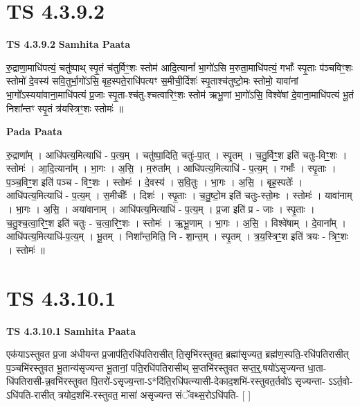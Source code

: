\documentclass[17pt]{extarticle}
\begin{document}

\section{ TS 4.3.9.2 }

\textbf{TS 4.3.9.2 } \newline
\textbf{Samhita Paata} \newline

रु॒द्राणा॒माधि॑पत्यं॒ चतु॑ष्पाथ् स्पृ॒तं च॑तुर्विꣳ॒॒शः स्तोम॑ आदि॒त्यानां᳚ भा॒गो॑ऽसि म॒रुता॒माधि॑पत्यं॒ गर्भाः᳚ स्पृ॒ताः प॑ञ्चविꣳ॒॒शः स्तोमो॑ दे॒वस्य॑ सवि॒तुर्भा॒गो॑ऽसि॒ बृह॒स्पते॒राधि॑पत्यꣳ स॒मीची॒र्दिशः॑ स्पृ॒ताश्च॑तुष्टो॒मः स्तोमो॒ यावा॑नां भा॒गो᳚ऽस्यया॑वाना॒माधि॑पत्यं प्र॒जाः स्पृ॒ता-श्च॑तु-श्चत्वारिꣳ॒॒शः स्तोम॑ ऋभू॒णां भा॒गो॑ऽसि॒ विश्वे॑षां दे॒वाना॒माधि॑पत्यं भू॒तं निशा᳚न्तꣳ स्पृ॒तं त्र॑यस्त्रिꣳ॒॒शः स्तोमः॑ ॥ \newline

\textbf{Pada Paata} \newline

रु॒द्राणा᳚म् । आधि॑पत्य॒मित्याधि॑ - प॒त्य॒म् । चतु॑ष्पा॒दिति॒ चतुः॑-पा॒त् । स्पृ॒तम् । च॒तु॒र्विꣳ॒॒श इति॑ चतुः-विꣳ॒॒शः । स्तोमः॑ । आ॒दि॒त्याना᳚म् । भा॒गः । अ॒सि॒ । म॒रुता᳚म् । आधि॑पत्य॒मित्याधि॑ - प॒त्य॒म् । गर्भाः᳚ । स्पृ॒ताः । प॒ञ्च॒विꣳ॒॒श इति॑ पञ्च - विꣳ॒॒शः । स्तोमः॑ । दे॒वस्य॑ । स॒वि॒तुः । भा॒गः । अ॒सि॒ । बृह॒स्पतेः᳚ । आधि॑पत्य॒मित्याधि॑ - प॒त्य॒म् । स॒मीचीः᳚ । दिशः॑ । स्पृ॒ताः । च॒तु॒ष्टो॒म इति॑ चतुः-स्तो॒मः । स्तोमः॑ । यावा॑नाम् । भा॒गः । अ॒सि॒ । अया॑वानाम् । आधि॑पत्य॒मित्याधि॑ - प॒त्य॒म् । प्र॒जा इति॑ प्र - जाः । स्पृ॒ताः । च॒तु॒श्च॒त्वा॒रिꣳ॒॒श इति॑ चतुः - च॒त्वा॒रिꣳ॒॒शः । स्तोमः॑ । ऋ॒भू॒णाम् । भा॒गः । अ॒सि॒ । विश्वे॑षाम् । दे॒वाना᳚म् । आधि॑पत्य॒मित्याधि॑-प॒त्य॒म् । भू॒तम् । निशा᳚न्त॒मिति॒ नि - शा॒न्त॒म् । स्पृ॒तम् । त्र॒य॒स्त्रिꣳ॒॒श इति॑ त्रयः - त्रिꣳ॒॒शः । स्तोमः॑ ॥  \newline





\section{ TS 4.3.10.1 }

\textbf{TS 4.3.10.1 } \newline
\textbf{Samhita Paata} \newline

एक॑याऽस्तुवत प्र॒जा अ॑धीयन्त प्र॒जाप॑ति॒रधि॑पतिरासीत् ति॒सृभि॑रस्तुवत॒ ब्रह्मा॑सृज्यत॒ ब्रह्म॑ण॒स्पति॒-रधि॑पतिरासीत् प॒ञ्चभि॑रस्तुवत भू॒तान्य॑सृज्यन्त भू॒तानां॒ पति॒रधि॑पतिरासीथ् स॒प्तभि॑रस्तुवत सप्त॒र्॒.षयो॑ऽसृज्यन्त धा॒ता-धि॑पतिरासी-न्न॒वभि॑रस्तुवत पि॒तरो॑-ऽसृज्य॒न्ता-ऽ*दि॑ति॒रधि॑पत्न्यासी-देकाद॒शभि॑-रस्तुवत॒र्तवो॑ऽ सृज्यन्ता- ऽऽर्त॒वो-ऽधि॑पति-रासीत् त्रयोद॒शभि॑-रस्तुवत॒ मासा॑ असृज्यन्त संॅवथ्स॒रोऽधि॑पति- [  ] \newline
\end{document}
